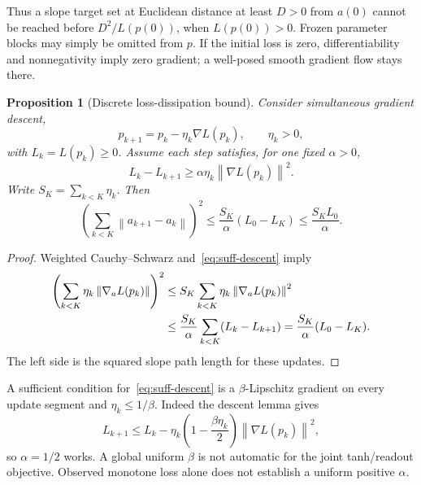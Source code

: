 \documentclass[11pt]{article}
\newtheorem{proposition}{Proposition}[section]
\theoremstyle{remark}
\newcommand{\norm}[1]{\left\lVert #1\right\rVert}
\begin{document}
Thus a slope target set at Euclidean distance at least $D>0$ from $a(0)$ cannot be reached before $D^2/L(p(0))$, when $L(p(0))>0$. Frozen parameter blocks may simply be omitted from $p$. If the initial loss is zero, differentiability and nonnegativity imply zero gradient; a well-posed smooth gradient flow stays there.

\begin{proposition}[Discrete loss-dissipation bound]
Consider simultaneous gradient descent,
\begin{equation}
 p_{k+1}=p_k-\eta_k\nabla L(p_k),\qquad \eta_k>0,
\end{equation}
with $L_k=L(p_k)\geq0$. Assume each step satisfies, for one fixed $\alpha>0$,
\begin{equation}
 L_k-L_{k+1}\geq\alpha\eta_k\norm{\nabla L(p_k)}^2.
 \label{eq:suff-descent}
\end{equation}
Write $S_K=\sum_{k<K}\eta_k$. Then
\begin{equation}
 \left(\sum_{k<K}\norm{a_{k+1}-a_k}\right)^2
 \leq\frac{S_K}{\alpha}(L_0-L_K)
 \leq\frac{S_KL_0}{\alpha}.
 \label{eq:energy-discrete}
\end{equation}
\end{proposition}
\begin{proof}
Weighted Cauchy--Schwarz and~\eqref{eq:suff-descent} imply
\begin{align}
 \left(\sum_{k<K}\eta_k\norm{\nabla_aL(p_k)}\right)^2
 &\leq S_K\sum_{k<K}\eta_k\norm{\nabla_aL(p_k)}^2\notag\\
 &\leq\frac{S_K}{\alpha}\sum_{k<K}(L_k-L_{k+1})
 =\frac{S_K}{\alpha}(L_0-L_K).
\end{align}
The left side is the squared slope path length for these updates.
\end{proof}

A sufficient condition for~\eqref{eq:suff-descent} is a $\beta$-Lipschitz gradient on every update segment and $\eta_k\leq1/\beta$. Indeed the descent lemma gives
\begin{equation}
 L_{k+1}\leq L_k-\eta_k\left(1-\frac{\beta\eta_k}{2}\right)
 \norm{\nabla L(p_k)}^2,
\end{equation}
so $\alpha=1/2$ works. A global uniform $\beta$ is not automatic for the joint tanh/readout objective. Observed monotone loss alone does not establish a uniform positive $\alpha$.
\end{document}
